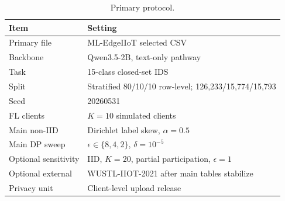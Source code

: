 \begin{table}[t]
\centering
\caption{Primary \dataset{} protocol.}
\label{tab:dataset_protocol}
\begin{tabular}{ll}
\toprule
Item & Setting \\
\midrule
Primary file & ML-EdgeIIoT selected CSV \\
Backbone & Qwen3.5-2B, text-only pathway \\
Task & 15-class closed-set IDS \\
Split & Stratified 80/10/10 row-level; 126,233/15,774/15,793 \\
Seed & 20260531 \\
FL clients & $K=10$ simulated clients \\
Main non-IID & Dirichlet label skew, $\alpha=0.5$ \\
Main DP sweep & $\epsilon\in\{8,4,2\}$, $\delta=10^{-5}$ \\
Optional sensitivity & IID, $K=20$, partial participation, $\epsilon=1$ \\
Optional external & WUSTL-IIOT-2021 after main tables stabilize \\
Privacy unit & Client-level upload release \\
\bottomrule
\end{tabular}
\end{table}
